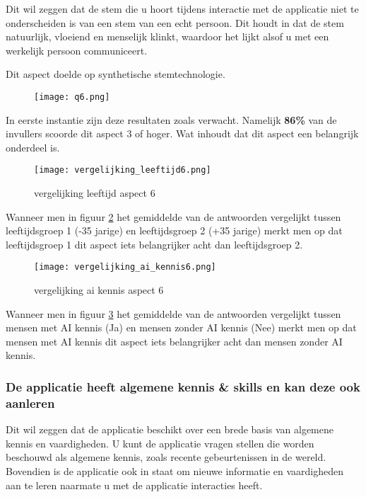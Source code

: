 Dit wil zeggen dat de stem die u hoort tijdens interactie met de applicatie niet te onderscheiden is van een stem van een echt persoon. Dit houdt in dat de stem natuurlijk, vloeiend en menselijk klinkt, waardoor het lijkt alsof u met een werkelijk persoon communiceert.

Dit aspect doelde op synthetische stemtechnologie.

\begin{figure}[htbp]
    \centering
    \texttt{[image: q6.png]}
    \label{fig:vraag_6_resultaat}
\end{figure}

In eerste instantie zijn deze resultaten zoals verwacht. Namelijk \textbf{86\%} van de invullers scoorde dit aspect 3 of hoger. Wat inhoudt dat dit aspect een belangrijk onderdeel is.

\begin{figure}[htbp]
    \centering
    \texttt{[image: vergelijking\_leeftijd6.png]}
    \caption{vergelijking leeftijd aspect 6}
    \label{fig:vergelijking_leeftijd6}
\end{figure}

Wanneer men in figuur \ref{fig:vergelijking_leeftijd6} het gemiddelde van de antwoorden vergelijkt tussen leeftijdsgroep 1 (-35 jarige) en leeftijdsgroep 2 (+35 jarige) merkt men op dat leeftijdsgroep 1 dit aspect iets belangrijker acht dan leeftijdsgroep 2.

\begin{figure}[htbp]
    \centering
    \texttt{[image: vergelijking\_ai\_kennis6.png]}
    \caption{vergelijking ai kennis aspect 6}
    \label{fig:vergelijking_ai_kennis6}
\end{figure}

Wanneer men in figuur \ref{fig:vergelijking_ai_kennis6} het gemiddelde van de antwoorden vergelijkt tussen mensen met AI kennis (Ja) en mensen zonder AI kennis (Nee) merkt men op dat mensen met AI kennis dit aspect iets belangrijker acht dan mensen zonder AI kennis.

\newpage

\subsubsection{De applicatie heeft algemene kennis \& skills en kan deze ook aanleren}

Dit wil zeggen dat de applicatie beschikt over een brede basis van algemene kennis en vaardigheden. U kunt de applicatie vragen stellen die worden beschouwd als algemene kennis, zoals recente gebeurtenissen in de wereld. Bovendien is de applicatie ook in staat om nieuwe informatie en vaardigheden aan te leren naarmate u met de applicatie interacties heeft.

